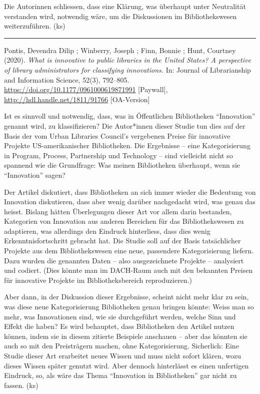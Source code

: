 \documentclass[a4paper,
fontsize=11pt,
oneside,
numbers=noperiodatend,
parskip=half-,
bibliography=totoc,
final
]{scrartcl}
\begin{document}
Die Autorinnen schliessen, dass eine Klärung, was überhaupt unter
Neutralität verstanden wird, notwendig wäre, um die Diskussionen im
Bibliothekswesen weiterzuführen. (ks)

\begin{center}\rule{0.5\linewidth}{0.5pt}\end{center}

Pontis, Devendra Dilip ; Winberry, Joseph ; Finn, Bonnie ; Hunt,
Courtney (2020). \emph{What is innovative to public libraries in the
United States? A perspective of library administrators for classifying
innovations.} In: Journal of Librarianship and Information Science,
52(3), 792--805. \url{https://doi.org/10.1177/0961000619871991}
{[}Paywall{]}, \url{http://hdl.handle.net/1811/91766} {[}OA-Version{]}

Ist es sinnvoll und notwendig, dass, was in Öffentlichen Bibliotheken
\enquote{Innovation} genannt wird, zu klassifizieren? Die Autor*innen
dieser Studie tun dies auf der Basis der vom Urban Libraries Council's
vergebenen Preise für innovative Projekte US-amerikanischer
Bibliotheken. Die Ergebnisse -- eine Kategorisierung in Program,
Process, Partnership und Technology -- sind vielleicht nicht so spannend
wie die Grundfrage: Was meinen Bibliotheken überhaupt, wenn sie
\enquote{Innovation} sagen?

Der Artikel diskutiert, dass Bibliotheken an sich immer wieder die
Bedeutung von Innovation diskutieren, dass aber wenig darüber
nachgedacht wird, was genau das heisst. Bislang hätten Überlegungen
dieser Art vor allem darin bestanden, Kategorien von Innovation aus
anderen Bereichen für das Bibliothekswesen zu adaptieren, was allerdings
den Eindruck hinterliess, dass dies wenig Erkenntnisfortschritt gebracht
hat. Die Studie soll auf der Basis tatsächlicher Projekte aus dem
Bibliothekswesen eine neue, passendere Kategorisierung liefern. Dazu
wurden die genannten Daten -- also ausgezeichnete Projekte -- analysiert
und codiert. (Dies könnte man im DACH-Raum auch mit den bekannten
Preisen für innovative Projekte im Bibliotheksbereich reproduzieren.)

Aber dann, in der Diskussion dieser Ergebnisse, scheint nicht mehr klar
zu sein, was diese neue Kategorisierung Bibliotheken genau bringen
könnte: Weiss man so mehr, was Innovationen sind, wie sie durchgeführt
werden, welche Sinn und Effekt die haben? Es wird behauptet, dass
Bibliotheken den Artikel nutzen können, indem sie in diesem zitierte
Beispiele anschauen -- aber das könnten sie auch so mit den Preisträgern
machen, ohne Kategorisierung. Sicherlich: Eine Studie dieser Art
erarbeitet neues Wissen und muss nicht sofort klären, wozu dieses Wissen
später genutzt wird. Aber dennoch hinterlässt es einen unfertigen
Eindruck, so, als wäre das Thema \enquote{Innovation in Bibliotheken}
gar nicht zu fassen. (ks)
\end{document}
